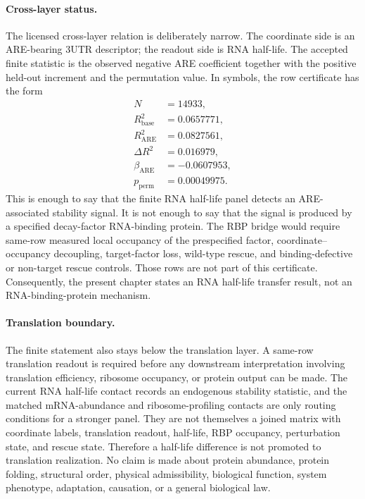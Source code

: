 \paragraph{Cross-layer status.}
The licensed cross-layer relation is deliberately narrow.  The coordinate side is an ARE-bearing 3UTR descriptor; the readout side is RNA half-life.  The accepted finite statistic is the observed negative ARE coefficient together with the positive held-out increment and the permutation value.  In symbols, the row certificate has the form
$$
\begin{aligned}
N &= 14933, \\
R^2_{\mathrm{base}} &= 0.0657771, \\
R^2_{\mathrm{ARE}} &= 0.0827561, \\
\Delta R^2 &= 0.016979, \\
\beta_{\mathrm{ARE}} &= -0.0607953, \\
p_{\mathrm{perm}} &= 0.00049975 .
\end{aligned}
$$
This is enough to say that the finite RNA half-life panel detects an ARE-associated stability signal.  It is not enough to say that the signal is produced by a specified decay-factor RNA-binding protein.  The RBP bridge would require same-row measured local occupancy of the prespecified factor, coordinate--occupancy decoupling, target-factor loss, wild-type rescue, and binding-defective or non-target rescue controls.  Those rows are not part of this certificate.  Consequently, the present chapter states an RNA half-life transfer result, not an RNA-binding-protein mechanism.

\paragraph{Translation boundary.}
The finite statement also stays below the translation layer.  A same-row translation readout is required before any downstream interpretation involving translation efficiency, ribosome occupancy, or protein output can be made.  The current RNA half-life contact records an endogenous stability statistic, and the matched mRNA-abundance and ribosome-profiling contacts are only routing conditions for a stronger panel.  They are not themselves a joined matrix with coordinate labels, translation readout, half-life, RBP occupancy, perturbation state, and rescue state.  Therefore a half-life difference is not promoted to translation realization.  No claim is made about protein abundance, protein folding, structural order, physical admissibility, biological function, system phenotype, adaptation, causation, or a general biological law.

